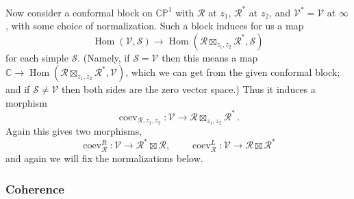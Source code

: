 \documentclass[12pt,letterpaper,reqno]{amsart}
\numberwithin{equation}{section}
\newcommand{\cS}{\ensuremath{\mathcal S}}
\newcommand{\bbC}{\ensuremath{\mathbb C}}
\newcommand{\bbP}{\ensuremath{\mathbb P}}
\newcommand\vac{{|\Omega\rangle}}
\newcommand{\vertex}{\mathcal{V}}
\newcommand{\vrep}{\mathcal{R}}
\DeclareMathOperator{\Hom}{Hom}
\DeclareMathOperator{\coev}{coev}
\begin{document}
Now consider a conformal block 
on $\bbC \bbP^1$ with $\vrep$ at $z_1$, $\vrep^*$ at $z_2$,
and $\vertex^* = \vertex$ at $\infty$, with some choice of normalization.
Such a block induces for us a map
\begin{equation}
 \Hom(\vertex, \cS) \to \Hom(\vrep \boxtimes_{z_1,z_2} \vrep^*, \cS) 
\end{equation}
for each simple $\cS$. (Namely, if $\cS = \vertex$ then this means a map $\bbC \to \Hom(\vrep \boxtimes_{z_1,z_2} \vrep^*, \vertex)$,
which we can get from the given conformal block; and if $\cS \neq \vertex$ then both sides are the zero vector space.)
Thus it induces a morphism
\begin{equation}
  \coev_{\vrep,z_1,z_2}: \vertex \to \vrep \boxtimes_{z_1,z_2} \vrep^* \, .
\end{equation}
Again this gives two morphisms,
\begin{equation}
  \coev^R_\vrep: \vertex \to \vrep^* \boxtimes \vrep, \qquad \coev^L_\vrep: \vertex \to \vrep \boxtimes \vrep^*
\end{equation}
and again we will fix the normalizations below.





\subsubsection{Coherence}
\end{document}
